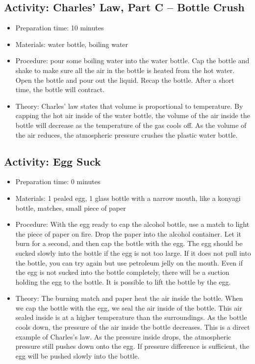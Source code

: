 \begin{itemize}
{\begin{itemize}
\begin{itemize}
{\subsection{Activity: Charles’ Law, Part C – Bottle Crush}
\begin{itemize}
\item{Preparation time: 10 minutes}
\item{Materials: water bottle, boiling water}
\item{Procedure: pour some boiling water into the water bottle. Cap the bottle and shake to make sure all the air in the bottle is heated from the hot water. Open the bottle and pour out the liquid. Recap the bottle. After a short time, the bottle will contract.}
\item{Theory: Charles’ law states that volume is proportional to temperature. By capping the hot air inside of the water bottle, the volume of the air inside the bottle will decrease as the temperature of the gas cools off. As the volume of the air reduces, the atmospheric pressure crushes the plastic water bottle.}
\end{itemize}

\subsection{Activity: Egg Suck}
\begin{itemize}
\item{Preparation time: 0 minutes}
\item{Materials: 1 pealed egg, 1 glass bottle with a narrow mouth, like a konyagi bottle, matches, small piece of paper}
\item{Procedure: With the egg ready to cap the alcohol bottle, use a match to light the piece of paper on fire. Drop the paper into the alcohol container. Let it burn for a second, and then cap the bottle with the egg. The egg should be sucked slowly into the bottle if the egg is not too large. If it does not pull into the bottle, you can try again but use petroleum jelly on the mouth. Even if the egg is not sucked into the bottle completely, there will be a suction holding the egg to the bottle. It is possible to lift the bottle by the egg.}
\item{Theory: The burning match and paper heat the air inside the bottle. When we cap the bottle with the egg, we seal the air inside of the bottle. This air sealed inside is at a higher temperature than the surroundings. As the bottle cools down, the pressure of the air inside the bottle decreases. This is a direct example of Charles’s law. As the pressure inside drops, the atmospheric pressure still pushes down onto the egg. If pressure difference is sufficient, the egg will be pushed slowly into the bottle. }
\end{itemize}

}
\end{itemize}
\end{itemize}}
\end{itemize}
